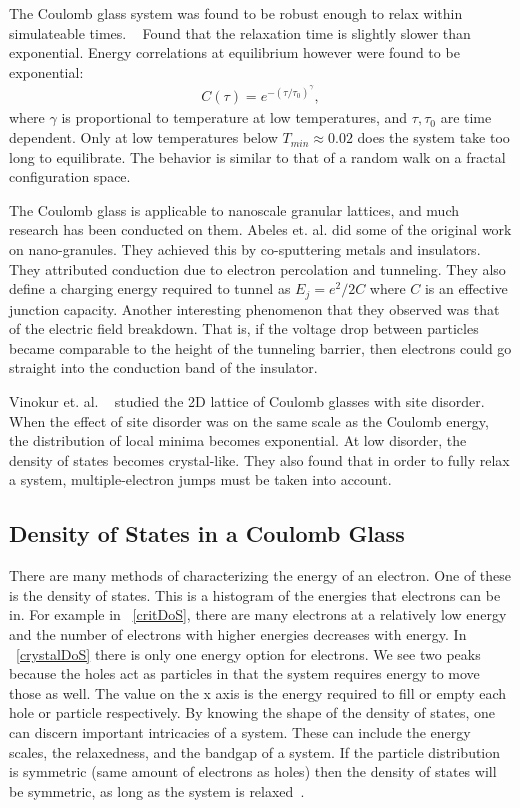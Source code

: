 The Coulomb glass system was found to be robust enough to relax within simulateable times. ~\cite{kirkengen09} Found that the relaxation time is slightly slower than exponential. Energy correlations at equilibrium however were found to be exponential:
\begin{eqnarray}
C(\tau) = e^{-(\tau / \tau_0)^\gamma},
\label{correlations}
\end{eqnarray}
where $\gamma$ is proportional to temperature at low temperatures, and $\tau , \tau_0$ are time dependent. Only at low temperatures below $T_{min} \approx 0.02$ does the system take too long to equilibrate. The behavior is similar to that of a random walk on a fractal configuration space.

The Coulomb glass is applicable to nanoscale granular lattices, and much research has been conducted on them. Abeles et. al. did some of the original work on nano-granules. They achieved this by co-sputtering metals and insulators. They attributed conduction due to electron percolation and tunneling. They also define a charging energy required to tunnel as $E_j = e^2/2C$ where $C$ is an effective junction capacity. Another interesting phenomenon that they observed was that of the electric field breakdown. That is, if the voltage drop between particles became comparable to the height of the tunneling barrier, then electrons could go straight into the conduction band of the insulator.

Vinokur et. al. ~\cite{Vinokur08} studied the 2D lattice of Coulomb glasses with site disorder. When the effect of site disorder was on the same scale as the Coulomb energy, the distribution of local minima becomes exponential. At low disorder, the density of states becomes crystal-like. They also found that in order to fully relax a system, multiple-electron jumps must be taken into account.

\subsection{Density of States in a Coulomb Glass}
There are many methods of characterizing the energy of an electron. One of these is the density of states. This is a histogram of the energies that electrons can be in. For example in ~\ref{critDoS}, there are many electrons at a relatively low energy and the number of electrons with higher energies decreases with energy. In ~\ref{crystalDoS} there is only one energy option for electrons. We see two peaks because the holes act as particles in that the system requires energy to move those as well. The value on the x axis is the energy required to fill or empty each hole or particle respectively. By knowing the shape of the density of states, one can discern important intricacies of a system. These can include the energy scales, the relaxedness, and the bandgap of a system. If the particle distribution is symmetric (same amount of electrons as holes) then the density of states will be symmetric, as long as the system is relaxed~\cite{Kittel96}.

